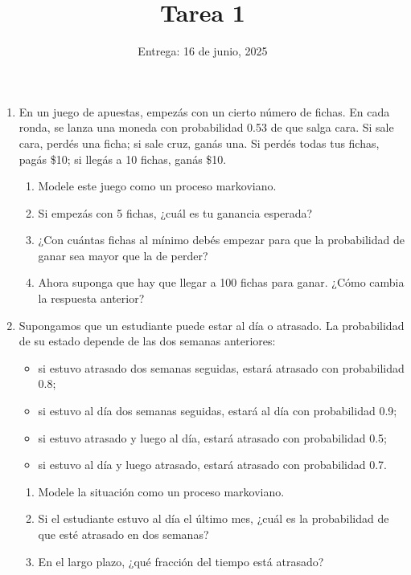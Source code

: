 \documentclass[12pt]{article}
\begin{document}
\title{Tarea 1}
\author{Entrega: 16 de junio, 2025}
\date{}
\maketitle

\begin{enumerate}

\item En un juego de apuestas, empezás con un cierto número de fichas. En cada ronda, se lanza una moneda con probabilidad 0.53 de que salga cara. Si sale cara, perdés una ficha; si sale cruz, ganás una. Si perdés todas tus fichas, pagás \$10; si llegás a 10 fichas, ganás \$10.

    \begin{enumerate}
    \item Modele este juego como un proceso markoviano.
    \item Si empezás con 5 fichas, ¿cuál es tu ganancia esperada?
    \item ¿Con cuántas fichas al mínimo debés empezar para que la probabilidad de ganar sea mayor que la de perder?
    \item Ahora suponga que hay que llegar a 100 fichas para ganar. ¿Cómo cambia la respuesta anterior?
    \end{enumerate}

\item Supongamos que un estudiante puede estar al día o atrasado. La probabilidad de su estado depende de las dos semanas anteriores:

    \begin{itemize}
        \item si estuvo atrasado dos semanas seguidas, estará atrasado con probabilidad 0.8;
        \item si estuvo al día dos semanas seguidas, estará al día con probabilidad 0.9;
        \item si estuvo atrasado y luego al día, estará atrasado con probabilidad 0.5;
        \item si estuvo al día y luego atrasado, estará atrasado con probabilidad 0.7.
    \end{itemize}

    \begin{enumerate}
    \item Modele la situación como un proceso markoviano.
    \item Si el estudiante estuvo al día el último mes, ¿cuál es la probabilidad de que esté atrasado en dos semanas?
    \item En el largo plazo, ¿qué fracción del tiempo está atrasado?
    \end{enumerate}


\end{enumerate}
\end{document}
